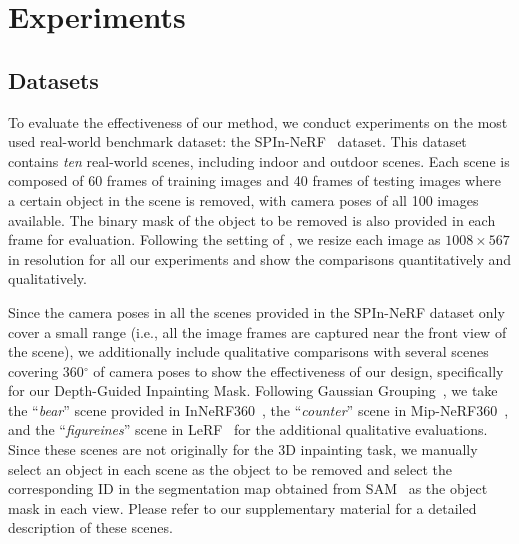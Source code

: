 \section{Experiments}
\label{sec:exp}







\subsection{Datasets}
To evaluate the effectiveness of our method, we conduct experiments on the most used real-world benchmark dataset: the SPIn-NeRF~\cite{mirzaei2023spin} dataset. This dataset contains \textit{ten} real-world scenes, including indoor and outdoor scenes. Each scene is composed of 60 frames of training images and 40 frames of testing images where a certain object in the scene is removed, with camera poses of all 100 images available. The binary mask of the object to be removed is also provided in each frame for evaluation. Following the setting of \cite{mirzaei2023spin, lin2024maldnerf, wang2024gscream, ye2023gaussiangrouping, chen2024mvip}, we resize each image as $1008 \times 567$ in resolution for all our experiments and show the comparisons quantitatively and qualitatively. 

Since the camera poses in all the scenes provided in the SPIn-NeRF dataset only cover a small range (i.e., all the image frames are captured near the front view of the scene), we additionally include qualitative comparisons with several scenes covering 360$^{\circ}$ of camera poses to show the effectiveness of our design, specifically for our Depth-Guided Inpainting Mask. Following Gaussian Grouping~\cite{ye2023gaussiangrouping}, we take the ``\textit{bear}'' scene provided in InNeRF360~\cite{wang2024innerf360}, the ``\textit{counter}'' scene in Mip-NeRF360~\cite{barron2022mipnerf360}, and the ``\textit{figureines}'' scene in LeRF~\cite{kerr2023lerf} for the additional qualitative evaluations. Since these scenes are not originally for the 3D inpainting task, we manually select an object in each scene as the object to be removed and select the corresponding ID in the segmentation map obtained from SAM~\cite{kirillov2023sam} as the object mask in each view. Please refer to our supplementary material for a detailed description of these scenes.


